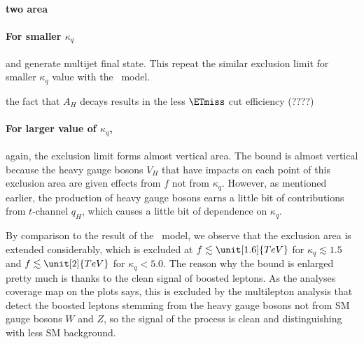 
\paragraph{two area}


\paragraph{For smaller $\kappa_q$ }


 and generate multijet final state.
This repeat the similar exclusion limit for smaller $\kappa_q$ value with the \fu~model.


the fact that $A_H$ decays results in the less $\ETmiss$ cut efficiency (????)

\paragraph{For larger value of $\kappa_q$,} again, the exclusion limit forms almost vertical area.
The bound is almost vertical because the heavy gauge bosons $V_H$ that have impacts on each point of this exclusion area
are given effects from $f$ not from $\kappa_q$.
However, as mentioned earlier, the production of heavy gauge bosons earns a little bit of contributions 
from $t$-channel $q_H$, which causes a little bit of dependence on $\kappa_q$.

By comparison to the result of the \fu~model, we observe that the exclusion area is extended considerably,
which is excluded at $f \lesssim \unit[1.6]{TeV}$ for $\kappa_q \lesssim 1.5$ and $f \lesssim \unit[2]{TeV}$ for $\kappa_q < 5.0$.
The reason why the bound is enlarged pretty much is thanks to the clean signal of boosted leptons.
As the analyses coverage map on the plots says, this is excluded by the multilepton analysis that
detect the boosted leptons stemming from the heavy gauge bosons not from SM gauge bosons $W$ and $Z$,
so the signal of the process is clean and distinguishing with less SM background. 


